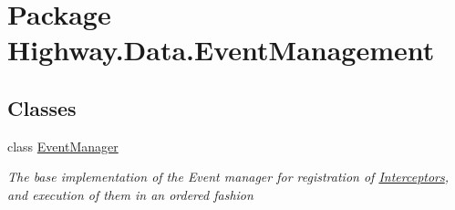 \hypertarget{namespace_highway_1_1_data_1_1_event_management}{\section{Package Highway.\-Data.\-Event\-Management}
\label{namespace_highway_1_1_data_1_1_event_management}
}
\subsection*{Classes}
\begin{DoxyCompactItemize}
\item 
class \hyperlink{class_highway_1_1_data_1_1_event_management_1_1_event_manager}{Event\-Manager}
\begin{DoxyCompactList}\small\item\em The base implementation of the Event manager for registration of \hyperlink{namespace_highway_1_1_data_1_1_interceptors}{Interceptors}, and execution of them in an ordered fashion \end{DoxyCompactList}\end{DoxyCompactItemize}
